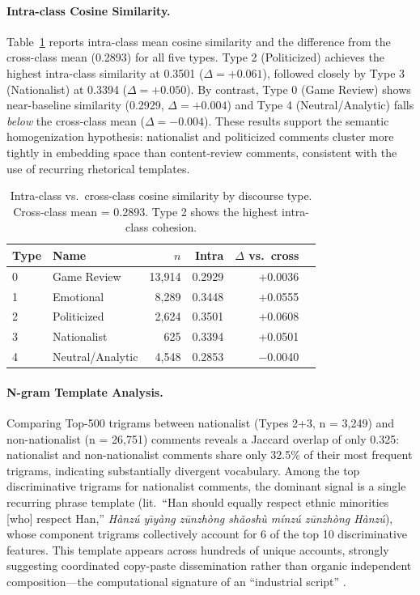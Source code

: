 \documentclass[letterpaper]{article}
\begin{document}
\paragraph{Intra-class Cosine Similarity.}
Table~\ref{tab:cosine} reports intra-class mean cosine similarity and the difference from the cross-class mean (0.2893) for all five types. Type 2 (Politicized) achieves the highest intra-class similarity at 0.3501 ($\Delta = +0.061$), followed closely by Type 3 (Nationalist) at 0.3394 ($\Delta = +0.050$). By contrast, Type 0 (Game Review) shows near-baseline similarity (0.2929, $\Delta = +0.004$) and Type 4 (Neutral/Analytic) falls \textit{below} the cross-class mean ($\Delta = -0.004$). These results support the semantic homogenization hypothesis: nationalist and politicized comments cluster more tightly in embedding space than content-review comments, consistent with the use of recurring rhetorical templates.

\begin{table}[t]
\centering
\caption{Intra-class vs.\ cross-class cosine similarity by discourse type. Cross-class mean = 0.2893. Type 2 shows the highest intra-class cohesion.}
\label{tab:cosine}
\begin{tabular}{llrrrr}
\toprule
Type & Name & $n$ & Intra & $\Delta$ vs.\ cross \\
\midrule
0 & Game Review & 13,914 & 0.2929 & +0.0036 \\
1 & Emotional & 8,289 & 0.3448 & +0.0555 \\
2 & Politicized & 2,624 & 0.3501 & +0.0608 \\
3 & Nationalist & 625 & 0.3394 & +0.0501 \\
4 & Neutral/Analytic & 4,548 & 0.2853 & $-$0.0040 \\
\bottomrule
\end{tabular}
\end{table}

\paragraph{N-gram Template Analysis.}
Comparing Top-500 trigrams between nationalist (Types 2+3, n = 3,249) and non-nationalist (n = 26,751) comments reveals a Jaccard overlap of only 0.325: nationalist and non-nationalist comments share only 32.5\% of their most frequent trigrams, indicating substantially divergent vocabulary. Among the top discriminative trigrams for nationalist comments, the dominant signal is a single recurring phrase template (lit.\ ``Han should equally respect ethnic minorities [who] respect Han,'' \textit{H\`{a}nz\'{u} y\={\i}y\`{a}ng z\={u}nzh\`{o}ng sh\v{a}osh\`{u} m\'{i}nz\'{u} z\={u}nzh\`{o}ng H\`{a}nz\'{u}}), whose component trigrams collectively account for 6 of the top 10 discriminative features. This template appears across hundreds of unique accounts, strongly suggesting coordinated copy-paste dissemination rather than organic independent composition---the computational signature of an ``industrial script'' \citep{schneider2018}.
\end{document}
